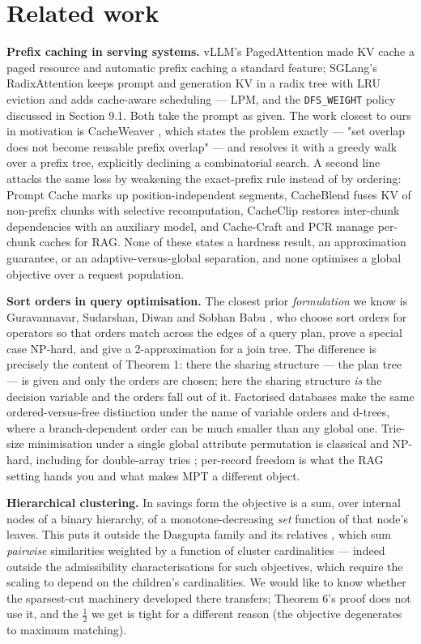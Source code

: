 \documentclass[11pt]{article}
\theoremstyle{plain}
\begin{document}
\section{Related work}

\textbf{Prefix caching in serving systems.} vLLM's PagedAttention \cite{KWO23} made KV cache a paged resource and automatic prefix caching a standard feature; SGLang's RadixAttention \cite{SGL} keeps prompt and generation KV in a radix tree with LRU eviction and adds cache-aware scheduling --- LPM, and the \texttt{DFS\string\_WEIGHT} policy discussed in Section 9.1. Both take the prompt as given. The work closest to ours in motivation is CacheWeaver \cite{CW26}, which states the problem exactly --- "set overlap does not become reusable prefix overlap" --- and resolves it with a greedy walk over a prefix tree, explicitly declining a combinatorial search. A second line attacks the same loss by weakening the exact-prefix rule instead of by ordering: Prompt Cache \cite{GIM24} marks up position-independent segments, CacheBlend \cite{CB24} fuses KV of non-prefix chunks with selective recomputation, CacheClip \cite{CC25} restores inter-chunk dependencies with an auxiliary model, and Cache-Craft \cite{CCR25} and PCR \cite{PCR26} manage per-chunk caches for RAG. None of these states a hardness result, an approximation guarantee, or an adaptive-versus-global separation, and none optimises a global objective over a request population.

\textbf{Sort orders in query optimisation.} The closest prior \emph{formulation} we know is Guravannavar, Sudarshan, Diwan and Sobhan Babu \cite{GSD06}, who choose sort orders for operators so that orders match across the edges of a query plan, prove a special case NP-hard, and give a 2-approximation for a join tree. The difference is precisely the content of Theorem 1: there the sharing structure --- the plan tree --- is given and only the orders are chosen; here the sharing structure \emph{is} the decision variable and the orders fall out of it. Factorised databases \cite{OZ15} make the same ordered-versus-free distinction under the name of variable orders and d-trees, where a branch-dependent order can be much smaller than any global one. Trie-size minimisation under a single global attribute permutation is classical and NP-hard, including for double-array tries \cite{KAN24}; per-record freedom is what the RAG setting hands you and what makes MPT a different object.

\textbf{Hierarchical clustering.} In savings form the objective is a sum, over internal nodes of a binary hierarchy, of a monotone-decreasing \emph{set} function of that node's leaves. This puts it outside the Dasgupta family \cite{DAS16} and its relatives \cite{CC17,MW17,CKM19}, which sum \emph{pairwise} similarities weighted by a function of cluster cardinalities --- indeed outside the admissibility characterisations for such objectives, which require the scaling to depend on the children's cardinalities. We would like to know whether the sparsest-cut machinery developed there transfers; Theorem 6's proof does not use it, and the $\tfrac12$ we get is tight for a different reason (the objective degenerates to maximum matching).
\end{document}
